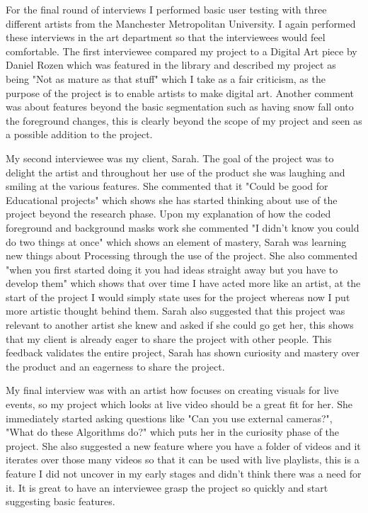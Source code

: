 \documentclass[a4paper]{report}
\begin{document}
For the final round of interviews I performed basic user testing with three different artists from the Manchester Metropolitan University. I again performed these interviews in the art department so that the interviewees would feel comfortable. The first interviewee compared my project to a Digital Art piece by Daniel Rozen which was featured in the library \cite{ROZEN} and described my project as being "Not as mature as that stuff" which I take as a fair criticism, as the purpose of the project is to enable artists to make digital art. Another comment was about features beyond the basic segmentation such as having snow fall onto the foreground changes, this is clearly beyond the scope of my project and seen as a possible addition to the project.

My second interviewee was my client, Sarah. The goal of the project was to delight the artist and throughout her use of the product she was laughing and smiling at the various features. She commented that it "Could be good for Educational projects" which shows she has started thinking about use of the project beyond the research phase. Upon my explanation of how the coded foreground and background masks work she commented "I didn't know you could do two things at once" which shows an element of mastery, Sarah was learning new things about Processing through the use of the project. She also commented "when you first started doing it you had ideas straight away but you have to develop them" which shows that over time I have acted more like an artist, at the start of the project I would simply state uses for the project whereas now I put more artistic thought behind them. Sarah also suggested that this project was relevant to another artist she knew and asked if she could go get her, this shows that my client is already eager to share the project with other people. This feedback validates the entire project, Sarah has shown curiosity and mastery over the product and an eagerness to share the project.
    
My final interview was with an artist how focuses on creating visuals for live events, so my project which looks at live video should be a great fit for her. She immediately started asking questions like "Can you use external cameras?", "What do these Algorithms do?" which puts her in the curiosity phase of the project. She also suggested a new feature where you have a folder of videos and it iterates over those many videos so that it can be used with live playlists, this is a feature I did not uncover in my early stages and didn't think there was a need for it. It is great to have an interviewee grasp the project so quickly and start suggesting basic features.
\end{document}
